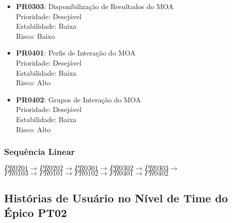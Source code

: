 \begin{itemize}
			\item{\textbf{PR0303}: Disponibilização de Resultados do MOA
			\\ Prioridade: Desejável
			\\ Estabilidade: Baixa
			\\ Risco: Baixo}
			\item{\textbf{PR0401}: Perfis de Interação do MOA
			\\ Prioridade: Desejável
			\\ Estabilidade: Baixa
			\\ Risco: Alto}
			\item{\textbf{PR0402}: Grupos de Interação do MOA
			\\ Prioridade: Desejável
			\\ Estabilidade: Baixa
			\\ Risco: Alto}
		\end{itemize}

	\subsubsection[Sequência Linear]{Sequência Linear}
	\label{subsubsec:requisitos_priorizacao_programa_sequencia}
		\begin{center}
		$PR0201 \rightarrow PR0202 \rightarrow PR0301 \rightarrow PR0302 \rightarrow PR0303 \rightarrow$
		\\
		$PR0103 \rightarrow PR0101 \rightarrow PR0102 \rightarrow PR0401 \rightarrow PR0402$
		\end{center}

\subsection[Histórias de Usuário no Nível de Time do Épico PT02]{Histórias de Usuário no Nível de Time do Épico PT02}
\label{subsec:requisitos_priorizacao_programa}
